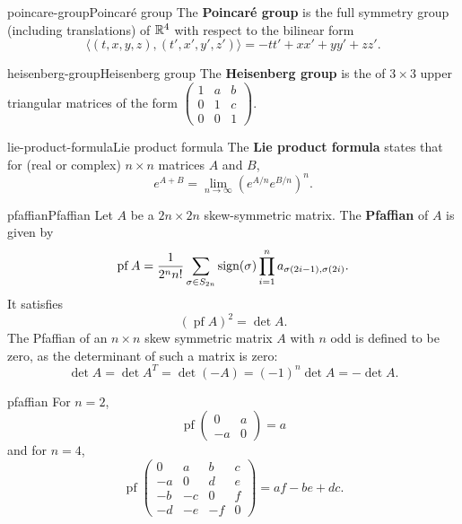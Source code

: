 \begin{topic}{poincare-group}{Poincaré group}
    The \textbf{Poincaré group} is the full symmetry group (including translations) of $\mathbb{R}^4$ with respect to the bilinear form
    \[ \langle (t, x, y, z), (t', x', y', z') \rangle = - tt' + xx' + yy' + zz' . \]
\end{topic}

\begin{topic}{heisenberg-group}{Heisenberg group}
    The \textbf{Heisenberg group} is the  of $3 \times 3$ upper triangular matrices of the form $\begin{pmatrix} 1 & a & b \\ 0 & 1 & c \\ 0 & 0 & 1 \end{pmatrix}$.
\end{topic}

\begin{topic}{lie-product-formula}{Lie product formula}
    The \textbf{Lie product formula} states that for (real or complex) $n \times n$ matrices $A$ and $B$,
    \[ e^{A + B} = \lim_{n \to \infty} \left( e^{A/n} e^{B/n} \right)^n . \]
\end{topic}

\begin{topic}{pfaffian}{Pfaffian}
    Let $A$ be a $2n \times 2n$ skew-symmetric matrix. The \textbf{Pfaffian} of $A$ is given by
    \[ \operatorname{pf} A = \frac{1}{2^n n!} \sum_{\sigma \in S_{2n}} \textup{sign}(\sigma) \prod_{i = 1}^{n} a_{\sigma(2i - 1), \sigma(2i)} . \]
    It satisfies
    \[ (\operatorname{pf} A)^2 = \det A . \]
    The Pfaffian of an $n \times n$ skew symmetric matrix $A$ with $n$ odd is defined to be zero, as the determinant of such a matrix is zero:
    \[ \det A = \det A^T = \det (-A) = (-1)^n \det A = -\det A . \]
\end{topic}

\begin{example}{pfaffian}
    For $n = 2$,
    \[ \operatorname{pf} \begin{pmatrix} 0 & a \\ -a & 0 \end{pmatrix} = a \]
    and for $n = 4$,
    \[ \operatorname{pf} \begin{pmatrix} 0 & a & b & c \\ -a & 0 & d & e \\ -b & -c & 0 & f \\ -d & -e & -f & 0 \end{pmatrix} = af - be + dc . \]
\end{example}

